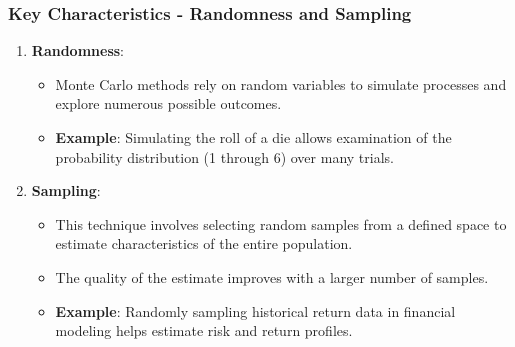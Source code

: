 \documentclass[aspectratio=169]{beamer}
\begin{document}
\begin{frame}[fragile]
    \frametitle{Key Characteristics - Randomness and Sampling}
    \begin{enumerate}
        \item \textbf{Randomness}:
        \begin{itemize}
            \item Monte Carlo methods rely on random variables to simulate processes and explore numerous possible outcomes.
            \item \textbf{Example}: Simulating the roll of a die allows examination of the probability distribution (1 through 6) over many trials.
        \end{itemize}

        \item \textbf{Sampling}:
        \begin{itemize}
            \item This technique involves selecting random samples from a defined space to estimate characteristics of the entire population.
            \item The quality of the estimate improves with a larger number of samples.
            \item \textbf{Example}: Randomly sampling historical return data in financial modeling helps estimate risk and return profiles.
        \end{itemize}
    \end{enumerate}
\end{frame}
\end{document}
